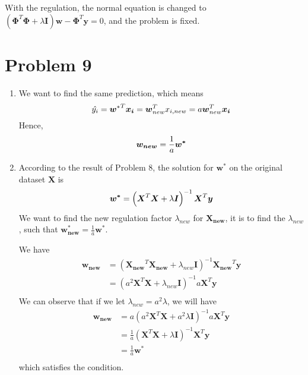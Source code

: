 \documentclass[12pt]{scrartcl}
\begin{document}
    With the regulation, the normal equation is changed to $\left( \boldsymbol{\Phi}^{T}\boldsymbol{\Phi} + \lambda \boldsymbol{I} \right) \boldsymbol{w} - \boldsymbol{\Phi}^{T}\boldsymbol{y} = 0$, and the problem is fixed.

  \section*{Problem 9}
  \begin{enumerate}[label = \alph*)]
      \item We want to find the same prediction, which means
      \[
          \hat{y_{i}} = {\boldsymbol{w}^{*}}^{T}\boldsymbol{x_i} =\boldsymbol{w}_{new}^{T}x_{i, new} = a\boldsymbol{w}_{new}^{T} \boldsymbol{x_i} \\
      \] 
      Hence,
      \[
      \boldsymbol{w_{new}} = \frac{1}{a}\boldsymbol{w^{*}} \\
      \] 
  \item According to the result of Problem 8, the solution for $\boldsymbol{w^{*}}$ on the original dataset $\boldsymbol{X}$ is \[
  \boldsymbol{w^{*}} =\left( \boldsymbol{X}^{T}\boldsymbol{X} + \lambda \boldsymbol{I} \right)^{-1}\boldsymbol{X}^{T}\boldsymbol{y}   \\
  \] 
  We want to find the new regulation factor $\lambda_{new}$ for $\boldsymbol{X_{new}}$, it is to find the $\lambda_{new}$, such that $\boldsymbol{w_{new}^{*}}  = \frac{1}{a}\boldsymbol{w^{*}}$.

  We have \[
      \begin{split}
      \boldsymbol{w_{new}} &= \left( \boldsymbol{X_{new}}^{T}\boldsymbol{X_{new}} + \lambda_{new}\boldsymbol{I} \right) ^{-1}\boldsymbol{X_{new}}^{T}\boldsymbol{y} \\
      &=\left( a^2 \boldsymbol{X}^{T}\boldsymbol{X} + \lambda_{new}\boldsymbol{I}\right)^{-1}a\boldsymbol{X}^{T}\boldsymbol{y} \\
      \end{split}
  \] 
  We can observe that if we let $\lambda_{new} = a^2\lambda$, we will have \[
  \begin{split}
      \boldsymbol{w_{new}} &= a\left( a^2\boldsymbol{X}^{T}\boldsymbol{X} + a^2\lambda\boldsymbol{I} \right) ^{-1}a\boldsymbol{X}^{T}\boldsymbol{y} \\
      &= \frac{1}{a} \left( \boldsymbol{X}^{T}\boldsymbol{X} + \lambda \boldsymbol{I} \right)^{-1}\boldsymbol{X}^{T}\boldsymbol{y}   \\
      &= \frac{1}{a}\boldsymbol{w^{*}} \\
  \end{split}
  \] which satisfies the condition.
  \end{enumerate}



 
\end{document}
